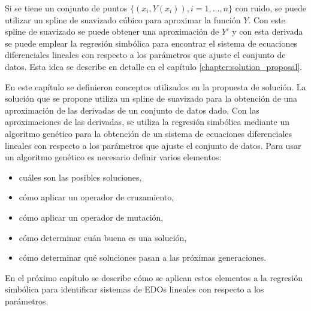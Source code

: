 Si se tiene un conjunto de puntos $\{(x_i, Y(x_i)), i = 1, \dots, n\}$ con ruido, se puede utilizar un spline de suavizado cúbico para aproximar la función $Y$. Con este spline de suavizado se puede obtener una aproximación de $Y'$ y con esta derivada se puede emplear la regresión simbólica para encontrar el sistema de ecuaciones diferenciales lineales con respecto a los parámetros que ajuste el conjunto de datos. Esta idea se describe en detalle en el capítulo \ref{chapter:solution_proposal}.

En este capítulo se definieron conceptos utilizados en la propuesta de solución. La solución que se propone utiliza un spline de suavizado para la obtención de una aproximación de las derivadas de un conjunto de datos dado. Con las aproximaciones de las derivadas, se utiliza la regresión simbólica mediante un algoritmo genético para la obtención de un sistema de ecuaciones diferenciales lineales con respecto a los parámetros que ajuste el conjunto de datos. Para usar un algoritmo genético es necesario definir varios elementos:

\begin{itemize}
    \item cuáles son las posibles soluciones,
    \item cómo aplicar un operador de cruzamiento,
    \item cómo aplicar un operador de mutación,
    \item cómo determinar cuán buena es una solución,
    \item cómo determinar qué soluciones pasan a las próximas generaciones.
\end{itemize}

En el próximo capítulo se describe cómo se aplican estos elementos a la regresión simbólica para identificar sistemas de EDOs lineales con respecto a los parámetros.
